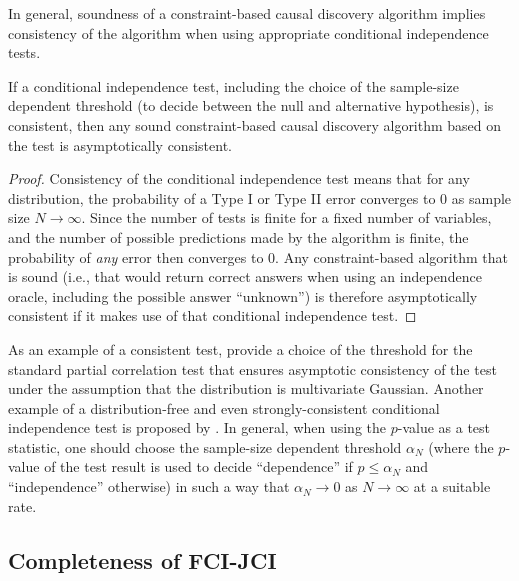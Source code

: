 \documentclass[twoside,11pt]{article}
\begin{document}
In general, soundness of a constraint-based causal discovery algorithm implies consistency of the algorithm when using appropriate conditional independence tests.
\begin{lemma}\label{lemm:consistency_constraint_based}
  If a conditional independence test, including the choice of the sample-size dependent threshold (to decide between the null and alternative hypothesis), is consistent, then any sound constraint-based causal discovery algorithm based on the test is asymptotically consistent.
\end{lemma}
\begin{proof}
  Consistency of the conditional independence test means that for any distribution, the probability of a Type I or Type II error converges to 0 as sample size $N \to \infty$. Since the number of tests is finite for a fixed number of variables, and the number of possible predictions made by the algorithm is finite, the probability of \emph{any} error then converges to 0. Any constraint-based algorithm that is sound (i.e., that would return correct answers when using an independence oracle, including the possible answer ``unknown'') is therefore asymptotically consistent if it makes use of that conditional independence test.
\end{proof}
As an example of a consistent test, \cite{KalischBuehlmann2007} provide a choice of the threshold for the standard partial correlation test that ensures
asymptotic consistency of the test under the assumption that the distribution is multivariate Gaussian. Another example of a
distribution-free and even strongly-consistent conditional independence test is proposed by \cite{GyorfiWalk2012}.
In general, when using the $p$-value as a test statistic, one should
choose the sample-size dependent threshold $\alpha_N$ (where the $p$-value of the test result is used to decide ``dependence''
if $p \le \alpha_N$ and ``independence'' otherwise) in such a way that $\alpha_N \to 0$ as $N \to \infty$ at a suitable rate. 

\subsection{Completeness of FCI-JCI}\label{sec:app:fcijci_complete}
\end{document}
